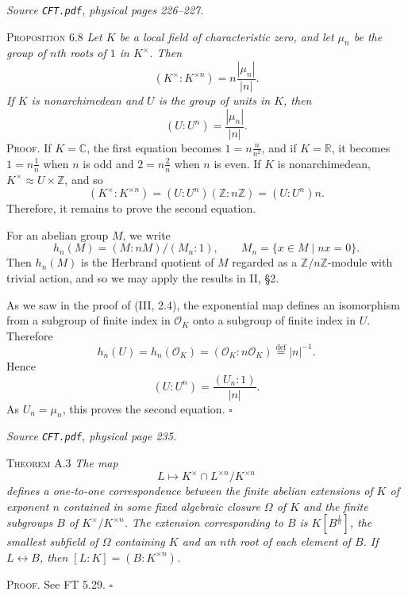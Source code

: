 \documentclass[11pt,a4paper]{article}
\begin{document}
\medskip
\noindent\emph{Source \texttt{CFT.pdf}, physical pages 226--227.}\par\medskip
\noindent\textsc{Proposition 6.8}
\emph{Let $K$ be a local field of characteristic zero, and let
$\mu_n$ be the group of $n$th roots of $1$ in $K^\times$. Then}
\[
(K^\times:K^{\times n})=n\frac{|\mu_n|}{|n|}.
\]
\emph{If $K$ is nonarchimedean and $U$ is the group of units in $K$, then}
\[
(U:U^n)=\frac{|\mu_n|}{|n|}.
\]
\noindent\textsc{Proof.} If $K=\mathbb C$, the first equation becomes
$1=n\frac{n}{n^2}$, and if $K=\mathbb R$, it becomes
$1=n\frac{1}{n}$ when $n$ is odd and $2=n\frac{2}{n}$ when $n$ is even.
If $K$ is nonarchimedean, $K^\times\approx U\times\mathbb Z$, and so
\[
(K^\times:K^{\times n})=(U:U^n)(\mathbb Z:n\mathbb Z)=(U:U^n)n.
\]
Therefore, it remains to prove the second equation.

For an abelian group $M$, we write
\[
h_n(M)=(M:nM)/(M_n:1),\qquad M_n=\{x\in M\mid nx=0\}.
\]
Then $h_n(M)$ is the Herbrand quotient of $M$ regarded as a
$\mathbb Z/n\mathbb Z$-module with trivial action, and so we may apply
the results in II, \S2.

As we saw in the proof of (III, 2.4), the exponential map defines an
isomorphism from a subgroup of finite index in $\mathcal O_K$ onto a
subgroup of finite index in $U$. Therefore
\[
h_n(U)=h_n(\mathcal O_K)=(\mathcal O_K:n\mathcal O_K)
\overset{\mathrm{def}}{=}|n|^{-1}.
\]
Hence
\[
(U:U^n)=\frac{(U_n:1)}{|n|}.
\]
As $U_n=\mu_n$, this proves the second equation. \hfill$\square$

\medskip
\noindent\emph{Source \texttt{CFT.pdf}, physical page 235.}\par\medskip
\noindent\textsc{Theorem A.3} \emph{The map}
\[
L\longmapsto K^\times\cap L^{\times n}/K^{\times n}
\]
\emph{defines a one-to-one correspondence between the finite abelian
extensions of $K$ of exponent $n$ contained in some fixed algebraic
closure $\Omega$ of $K$ and the finite subgroups $B$ of
$K^\times/K^{\times n}$. The extension corresponding to $B$ is
$K[B^{\frac{1}{n}}]$, the smallest subfield of $\Omega$ containing $K$
and an $n$th root of each element of $B$. If $L\leftrightarrow B$,
then $[L:K]=(B:K^{\times n})$.}

\noindent\textsc{Proof.} See FT 5.29. \hfill$\square$
\end{document}
